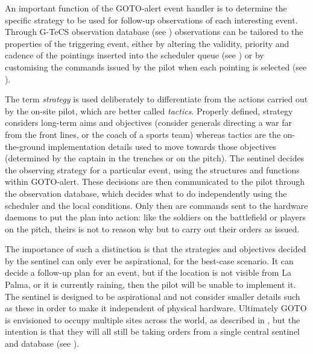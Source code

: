 \begin{colsection}

An important function of the GOTO-alert event handler is to determine the specific strategy to be used for follow-up observations of each interesting event. Through G-TeCS observation database (see ) observations can be tailored to the properties of the triggering event, either by altering the validity, priority and cadence of the pointings inserted into the scheduler queue (see ) or by customising the commands issued by the pilot when each pointing is selected (see ).

The term \emph{strategy} is used deliberately to differentiate from the actions carried out by the on-site pilot, which are better called \emph{tactics}. Properly defined, strategy considers long-term aims and objectives (consider generals directing a war far from the front lines, or the coach of a sports team) whereas tactics are the on-the-ground implementation details used to move towards those objectives (determined by the captain in the trenches or on the pitch). The sentinel decides the observing strategy for a particular event, using the structures and functions within GOTO-alert. These decisions are then communicated to the pilot through the observation database, which decides what to do independently using the scheduler and the local conditions. Only then are commands sent to the hardware daemons to put the plan into action: like the soldiers on the battlefield or players on the pitch, theirs is not to reason why but to carry out their orders as issued.

The importance of such a distinction is that the strategies and objectives decided by the sentinel can only ever be aspirational, for the best-case scenario. It can decide a follow-up plan for an event, but if the location is not visible from La Palma, or it is currently raining, then the pilot will be unable to implement it. The sentinel is designed to be aspirational and not consider smaller details such as these in order to make it independent of physical hardware. Ultimately GOTO is envisioned to occupy multiple sites across the world, as described in , but the intention is that they will all still be taking orders from a single central sentinel and database (see ).

\end{colsection}


